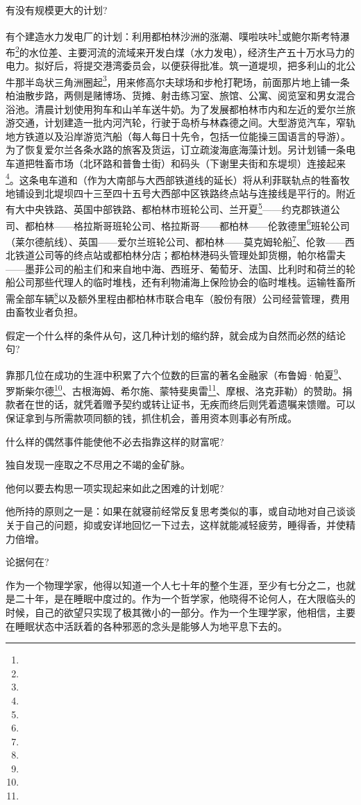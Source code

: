 \par 有没有规模更大的计划?
\par 有个建造水力发电厂的计划：利用都柏林沙洲的涨潮、噗啦呋咔\footnote{}或鲍尔斯考特瀑布\footnote{}的水位差、主要河流的流域来开发白煤（水力发电），经济生产五十万水马力的电力。拟好后，将提交港湾委员会，以便获得批准。筑一道堤坝，把多利山的北公牛那半岛状三角洲圈起\footnote{}，用来修高尔夫球场和步枪打靶场，前面那片地上铺一条柏油散步路，两侧是赌博场、货摊、射击练习室、旅馆、公寓、阅览室和男女混合浴池。清晨计划使用狗车和山羊车送牛奶。为了发展都柏林市内和左近的爱尔兰旅游交通，计划建造一批内河汽轮，行驶于岛桥与林森德之间。大型游览汽车，窄轨地方铁道以及沿岸游览汽船（每人每日十先令，包括一位能操三国语言的导游）。为了恢复爱尔兰各条水路的旅客及货运，订立疏浚海底海藻计划。另计划铺一条电车道把牲畜市场（北环路和普鲁士街）和码头（下谢里夫街和东堤坝）连接起来\footnote{}。这条电车道和（作为大南部与大西部铁道线的延长）将从利菲联轨点的牲畜牧地铺设到北堤坝四十三至四十五号大西部中区铁路终点站与连接线是平行的。附近有大中央铁路、英国中部铁路、都柏林市班轮公司、兰开夏\footnote{}——约克郡铁道公司、都柏林——格拉斯哥班轮公司、格拉斯哥——都柏林——伦敦德里\footnote{}班轮公司（莱尔德航线）、英国——爱尔兰班轮公司、都柏林——莫克姆轮船\footnote{}、伦敦——西北铁道公司等的终点站或都柏林分店；都柏林港码头管理处卸货棚，帕尔格雷夫——墨菲公司的船主们和来自地中海、西班牙、葡萄牙、法国、比利时和荷兰的轮船公司那些代理人的临时堆栈，还有利物浦海上保险协会的临时堆栈。运输牲畜所需全部车辆\footnote{}以及额外里程由都柏林市联合电车（股份有限）公司经营管理，费用由畜牧业者负担。
\par 假定一个什么样的条件从句，这几种计划的缩约辞，就会成为自然而必然的结论句?
\par 靠那几位在成功的生涯中积累了六个位数的巨富的著名金融家（布鲁姆·帕夏\footnote{}、罗斯柴尔德\footnote{}、古根海姆、希尔施、蒙特斐奥雷\footnote{}、摩根、洛克菲勒）的赞助。捐款者在世的话，就凭着赠予契约或转让证书，无疾而终后则凭着遗嘱来馈赠。可以保证拿到与所需款项同额的钱，抓住机会，善用资本则事必有所成。
\par 什么样的偶然事件能使他不必去指靠这样的财富呢?
\par 独自发现一座取之不尽用之不竭的金矿脉。
\par 他何以要去构思一项实现起来如此之困难的计划呢?
\par 他所持的原则之一是：如果在就寝前经常反复思考类似的事，或自动地对自己谈谈关于自己的问题，抑或安详地回忆一下过去，这样就能减轻疲劳，睡得香，并使精力倍增。
\par 论据何在?
\par 作为一个物理学家，他得以知道一个人七十年的整个生涯，至少有七分之二，也就是二十年，是在睡眠中度过的。作为一个哲学家，他晓得不论何人，在大限临头的时候，自己的欲望只实现了极其微小的一部分。作为一个生理学家，他相信，主要在睡眠状态中活跃着的各种邪恶的念头是能够人为地平息下去的。
